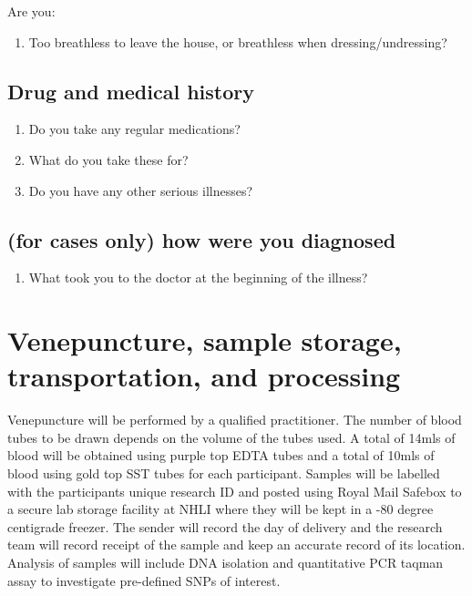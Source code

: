 \documentclass[a4paper,10pt]{article}
\begin{document}
Are you:

\begin{enumerate}[resume]
\item Too breathless to leave the house, or breathless when dressing/undressing?
\end{enumerate}

\subsection{Drug and medical history}

\begin{enumerate}
\item Do you take any regular medications?
\item What do you take these for?
\item Do you have any other serious illnesses?
\end{enumerate}

\subsection{(for cases only) how were you diagnosed}

\begin{enumerate}
\item What took you to the doctor at the beginning of the illness? 
\end{enumerate}

\section{Venepuncture, sample storage, transportation, and processing} 

Venepuncture will be performed by a qualified practitioner. The number of blood tubes to be drawn depends on the volume of the tubes used. A total of 14mls of blood will be obtained using purple top EDTA tubes and a total of 10mls of blood using gold top SST tubes for each participant. Samples will be labelled with the participants unique research ID and posted using Royal Mail Safebox to a secure lab storage facility at NHLI where they will be kept in a -80 degree centigrade freezer.
The sender will record the day of delivery and the research team will record receipt of the sample and keep an accurate record of its location. Analysis of samples will include DNA isolation and quantitative PCR taqman assay to investigate pre-defined SNPs of interest.
\end{document}
